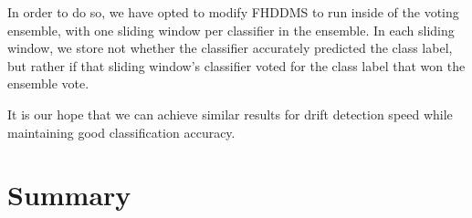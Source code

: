 In order to do so, we have opted to modify FHDDMS to run inside of the voting ensemble, with one sliding window per classifier in the ensemble. In each sliding window, we store not whether the classifier accurately predicted the class label, but rather if that sliding window's classifier voted for the class label that won the ensemble vote.

It is our hope that we can achieve similar results for drift detection speed while maintaining good classification accuracy.


\section{Summary}

